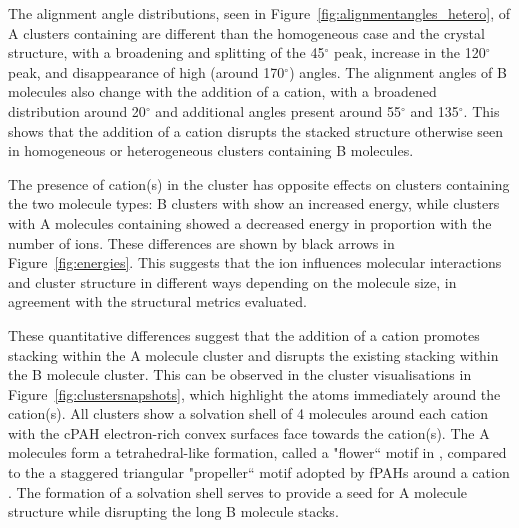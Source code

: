 The alignment angle distributions, seen in Figure~\ref{fig:alignmentangles_hetero}, of A clusters containing  are different than the homogeneous case and the crystal structure, with a broadening and splitting of the 45$^{\circ}$ peak, increase in the 120$^{\circ}$ peak, and disappearance of high (around 170$^{\circ}$) angles. The alignment angles of B molecules also change with the addition of a cation, with a broadened distribution around 20$^{\circ}$ and additional angles present around 55$^{\circ}$ and 135$^{\circ}$. This shows that the addition of a cation disrupts the stacked structure otherwise seen in homogeneous or heterogeneous clusters containing B molecules. 

The presence of cation(s) in the cluster has opposite effects on clusters containing the two molecule types: B clusters with  show an increased energy, while clusters with A molecules containing  showed a decreased energy in proportion with the number of ions.  These differences are shown by black arrows in Figure~\ref{fig:energies}. This suggests that the ion influences molecular interactions and cluster structure in different ways depending on the molecule size, in agreement with the structural metrics evaluated.

These quantitative differences suggest that the addition of a cation promotes stacking within the A molecule cluster and disrupts the existing stacking within the B molecule cluster. This can be observed in the cluster visualisations in Figure~\ref{fig:clustersnapshots}, which highlight the atoms immediately around the cation(s). All clusters show a solvation shell of 4 molecules around each cation with the cPAH electron-rich convex surfaces face towards the cation(s). The A molecules form a tetrahedral-like formation, called a "flower`` motif in \citet{bowal2019ion}, compared to the a staggered triangular "propeller`` motif adopted by fPAHs around a cation \cite{bartolomei2019aggregation}. The formation of a solvation shell serves to provide a seed for A molecule structure while disrupting the long B molecule stacks.

